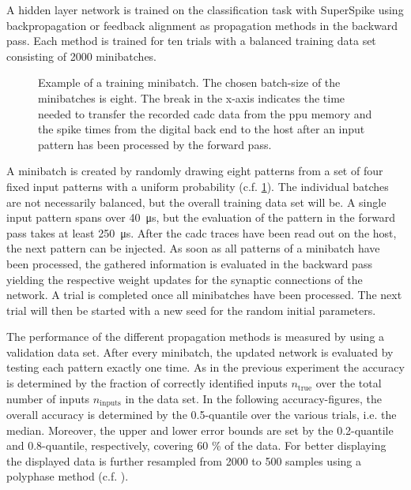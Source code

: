 A hidden layer network is trained on the classification task with SuperSpike using backpropagation or feedback alignment as propagation methods in the backward pass. Each method is trained for ten trials with a balanced training data set consisting of 2000 minibatches.

\begin{figure}
	\centering
	
	\caption[Example of a training minibatch.]{Example of a training minibatch. The chosen batch-size of the minibatches is eight. The break in the x-axis indicates the time needed to transfer the recorded \gls{cadc} data from the \gls{ppu} memory and the spike times from the digital back end to the host after an input pattern has been processed by the forward pass.}
	\label{batchpatterns}
\end{figure}

A minibatch is created by randomly drawing eight patterns from a set of four fixed input patterns with a uniform probability (c.f. \cref{batchpatterns}). The individual batches are not necessarily balanced, but the overall training data set will be. A single input pattern spans over \SI{40}{\micro \s}, but the evaluation of the pattern in the forward pass takes at least \SI{250}{\micro \s}. After the \gls{cadc} traces have been read out on the host, the next pattern can be injected. As soon as all patterns of a minibatch have been processed, the gathered information is evaluated in the backward pass yielding the respective weight updates for the synaptic connections of the network. A trial is completed once all minibatches have been processed. The next trial will then be started with a new seed for the random initial parameters.

The performance of the different propagation methods is measured by using a validation data set. After every minibatch, the updated network is evaluated by testing each pattern exactly one time. As in the previous experiment the accuracy is determined by the fraction of correctly identified inputs $n_\text{true}$ over the total number of inputs $n_\text{inputs}$ in the data set. In the following accuracy-figures, the overall accuracy is determined by the 0.5-quantile over the various trials, i.e. the median. Moreover, the upper and lower error bounds are set by the 0.2-quantile and 0.8-quantile, respectively, covering 60 \% of the data. For better displaying the displayed data is further resampled from 2000 to 500 samples using a polyphase method  (c.f. \citealp{scipypolyresample}).

